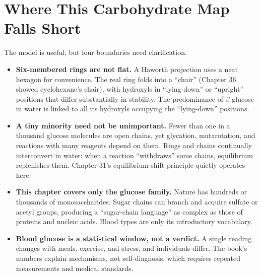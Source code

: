 \section{Where This Carbohydrate Map Falls Short}

The model is useful, but four boundaries need clarification.

\begin{itemize}[itemsep=2pt]
\item \textbf{Six-membered rings are not flat.} A Haworth projection uses a neat hexagon for convenience. The real ring folds into a ``chair'' (Chapter 36 showed cyclohexane's chair), with hydroxyls in ``lying-down'' or ``upright'' positions that differ substantially in stability. The predominance of $\beta$ glucose in water is linked to all its hydroxyls occupying the ``lying-down'' positions.
\item \textbf{A tiny minority need not be unimportant.} Fewer than one in a thousand glucose molecules are open chains, yet glycation, mutarotation, and reactions with many reagents depend on them. Rings and chains continually interconvert in water: when a reaction ``withdraws'' some chains, equilibrium replenishes them. Chapter 31's equilibrium-shift principle quietly operates here.
\item \textbf{This chapter covers only the glucose family.} Nature has hundreds or thousands of monosaccharides. Sugar chains can branch and acquire sulfate or acetyl groups, producing a ``sugar-chain language'' as complex as those of proteins and nucleic acids. Blood types are only its introductory vocabulary.
\item \textbf{Blood glucose is a statistical window, not a verdict.} A single reading changes with meals, exercise, and stress, and individuals differ. The book's numbers explain mechanisms, not self-diagnosis, which requires repeated measurements and medical standards.
\end{itemize}

